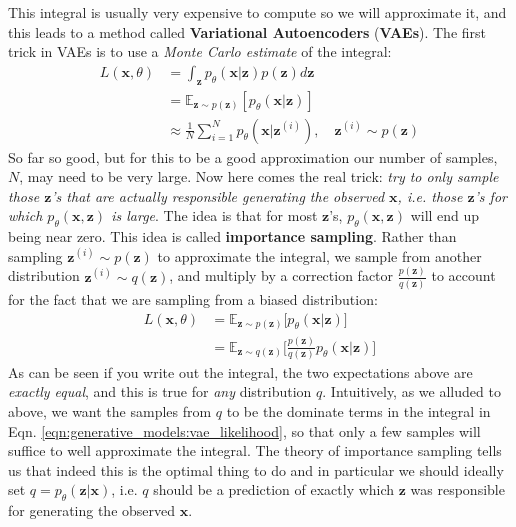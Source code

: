 This integral is usually very expensive to compute so we will approximate it, and this leads to a method called {\bf Variational Autoencoders} ({\bf VAEs}). The first trick in VAEs is to use a \textit{Monte Carlo estimate} of the integral:
\begin{align}
    L(\mathbf{x}, \theta) &= \int_{\mathbf{z}} p_{\theta}(\mathbf{x} | \mathbf{z})p(\mathbf{z})d\mathbf{z} \label{eqn:generative_models:vae_likelihood}\\
    &= \mathbb{E}_{\mathbf{z}\sim p(\mathbf{z})}[p_{\theta}(\mathbf{x} | \mathbf{z})]\\
    &\approx \frac{1}{N} \sum_{i=1}^N p_{\theta}(\mathbf{x} | \mathbf{z}^{(i)}), \quad \mathbf{z}^{(i)} \sim p(\mathbf{z})
\end{align}
So far so good, but for this to be a good approximation our number of samples, $N$, may need to be very large. Now here comes the real trick: \textit{try to only sample those $\mathbf{z}$'s that are actually responsible generating the observed $\mathbf{x}$, i.e. those $\mathbf{z}$'s for which $p_{\theta}(\mathbf{x}, \mathbf{z})$ is large}. The idea is that for most $\mathbf{z}$'s, $p_{\theta}(\mathbf{x}, \mathbf{z})$ will end up being near zero. This idea is called {\bf importance sampling}. Rather than sampling $\mathbf{z}^{(i)} \sim p(\mathbf{z})$ to approximate the integral, we sample from another distribution $\mathbf{z}^{(i)} \sim q(\mathbf{z})$, and multiply by a correction factor $\frac{p(\mathbf{z})}{q(\mathbf{z})}$ to account for the fact that we are sampling from a biased distribution:
\begin{align}
L(\mathbf{x}, \theta) &= \mathbb{E}_{\mathbf{z}\sim p(\mathbf{z})}\Big[p_{\theta}(\mathbf{x} | \mathbf{z})\Big] \label{eqn:generative_models:vae_likelihood2}\\
&= \mathbb{E}_{\mathbf{z}\sim q(\mathbf{z})}\Big[\frac{p(\mathbf{z})}{q(\mathbf{z})} p_{\theta}(\mathbf{x} | \mathbf{z})\Big]%
\end{align}
As can be seen if you write out the integral, the two expectations above are \textit{exactly equal}, and this is true for \textit{any} distribution $q$. Intuitively, as we alluded to above, we want the samples from $q$ to be the dominate terms in the integral in Eqn. \ref{eqn:generative_models:vae_likelihood}, so that only a few samples will suffice to well approximate the integral. The theory of importance sampling tells us that indeed this is the optimal thing to do and in particular we should ideally set $q = p_{\theta}(\mathbf{z}|\mathbf{x})$, i.e. $q$ should be a prediction of exactly which $\mathbf{z}$ was responsible for generating the observed $\mathbf{x}$. 

